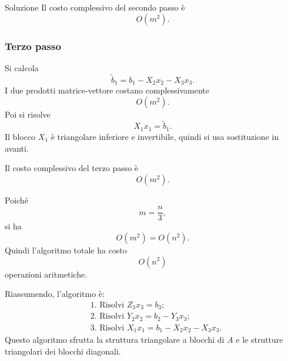 \documentclass[a4paper]{article}
\begin{document}
\begin{snippetsolution}{Soluzione}
    Il costo complessivo del secondo passo è
    \[
        O(m^2).
    \]

    \subsubsection*{Terzo passo}

    Si calcola
    \[
        \widetilde b_1=b_1-X_2x_2-X_3x_3.
    \]
    I due prodotti matrice-vettore costano complessivamente
    \[
        O(m^2).
    \]
    Poi si risolve
    \[
        X_1x_1=\widetilde b_1.
    \]
    Il blocco \(X_1\) è triangolare inferiore e invertibile, quindi si usa sostituzione in avanti.

    Il costo complessivo del terzo passo è
    \[
        O(m^2).
    \]

    Poiché
    \[
        m=\frac{n}{3},
    \]
    si ha
    \[
        O(m^2)=O(n^2).
    \]
    Quindi l'algoritmo totale ha costo
    \[
        \boxed{
            O(n^2)
        }
    \]
    operazioni aritmetiche.

    Riassumendo, l'algoritmo è:
    \[
        \boxed{
            \begin{aligned}
                &\text{1. Risolvi } Z_3x_3=b_3;\\
                &\text{2. Risolvi } Y_2x_2=b_2-Y_3x_3;\\
                &\text{3. Risolvi } X_1x_1=b_1-X_2x_2-X_3x_3.
            \end{aligned}
        }
    \]
    Questo algoritmo sfrutta la struttura triangolare a blocchi di \(A\) e le strutture triangolari dei blocchi diagonali.
\end{snippetsolution}
\end{document}
